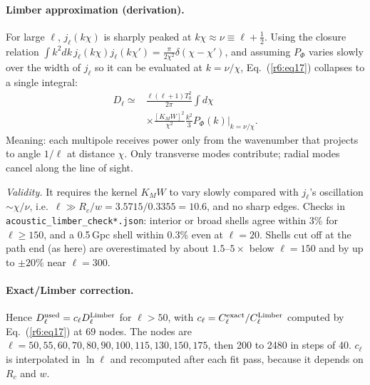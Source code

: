 \documentclass[11pt]{article}
\newcommand{\why}[1]{\par\noindent\textit{Validity.} #1\par}
\begin{document}
\paragraph{Limber approximation (derivation).} For large $\ell$, $j_\ell(k\chi)$ is sharply peaked at $k\chi\approx\nu\equiv\ell+\tfrac12$. Using the closure relation $\int k^2dk\,j_\ell(k\chi)j_\ell(k\chi')=\frac{\pi}{2\chi^2}\delta(\chi-\chi')$, and assuming $P_\Phi$ varies slowly over the width of $j_\ell$ so it can be evaluated at $k=\nu/\chi$, Eq.~(\ref{r6:eq17}) collapses to a single integral:
\begin{equation}\label{r6:eq18}\begin{split}
D_\ell\simeq&\frac{\ell(\ell+1)T_0^2}{2\pi}\int d\chi\\
&\times\frac{[K_MW]^2}{\chi^2}\frac{k^2}{3}P_\Phi(k)\Big|_{k=\nu/\chi}.
\end{split}\end{equation}
Meaning: each multipole receives power only from the wavenumber that projects to angle $1/\ell$ at distance $\chi$. Only transverse modes contribute; radial modes cancel along the line of sight.
\why{It requires the kernel $K_MW$ to vary slowly compared with $j_\ell$'s oscillation $\sim\chi/\nu$, i.e.\ $\ell\gg R_c/w=3.5715/0.3355=10.6$, and no sharp edges. Checks in \texttt{acoustic\_limber\_check*.json}: interior or broad shells agree within 3\% for $\ell\ge150$, and a 0.5\,Gpc shell within 0.3\% even at $\ell=20$. Shells cut off at the path end (as here) are overestimated by about $1.5$--$5\times$ below $\ell=150$ and by up to $\pm20\%$ near $\ell=300$.}

\paragraph{Exact/Limber correction.} Hence $D^{\rm used}_\ell=c_\ell D^{\rm Limber}_\ell$ for $\ell>50$, with $c_\ell=C^{\rm exact}_\ell/C^{\rm Limber}_\ell$ computed by Eq.~(\ref{r6:eq17}) at 69 nodes. The nodes are $\ell=50,55,60,70,80,90,100,115,130,150,175$, then 200 to 2480 in steps of 40. $c_\ell$ is interpolated in $\ln\ell$ and recomputed after each fit pass, because it depends on $R_c$ and $w$.
\end{document}
